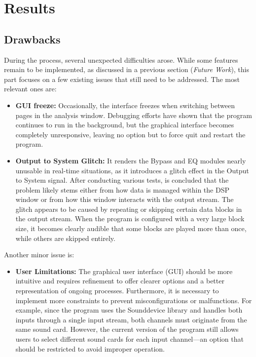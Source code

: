 \chapter{Results}


\section{Drawbacks}

During the process, several unexpected difficulties arose. While some features remain to be implemented, as discussed in a previous section (\textit{Future Work}), this part focuses on a few existing issues that still need to be addressed. The most relevant ones are:

\begin{itemize}
	\item \textbf{GUI freeze:} Occasionally, the interface freezes when switching between pages in the analysis window. Debugging efforts have shown that the program continues to run in the background, but the graphical interface becomes completely unresponsive, leaving no option but to force quit and restart the program.
	
	\item \textbf{Output to System Glitch:} It renders the Bypass and EQ modules nearly unusable in real-time situations, as it introduces a glitch effect in the Output to System signal. After conducting various tests, is concluded that the problem likely stems either from how data is managed within the DSP window or from how this window interacts with the output stream. The glitch appears to be caused by repeating or skipping certain data blocks in the output stream. When the program is configured with a very large block size, it becomes clearly audible that some blocks are played more than once, while others are skipped entirely.
\end{itemize}

Another minor issue is:

\begin{itemize}
	
	\item \textbf{User Limitations:} The graphical user interface (GUI) should be more intuitive and requires refinement to offer clearer options and a better representation of ongoing processes. Furthermore, it is necessary to implement more constraints to prevent misconfigurations or malfunctions. For example, since the program uses the Sounddevice library and handles both inputs through a single input stream, both channels must originate from the same sound card. However, the current version of the program still allows users to select different sound cards for each input channel—an option that should be restricted to avoid improper operation.
		
\end{itemize}

